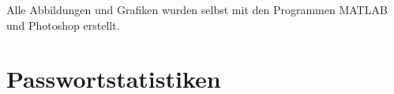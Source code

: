 \documentclass[12pt,a4paper]{scrartcl}
\newcommand{\spar}{\par\vspace{10pt}\noindent}
\numberwithin{equation}{section}
\numberwithin{myalgctr}{section}
\numberwithin{mytheoremctr}{section}
\begin{document}
%	
%	
%	
	
	
	
%
%
%	
%	
%	
	
	\newpage
	\printbibliography
	\listoffigures
	\vspace*{.5cm}\noindent
	Alle Abbildungen und Grafiken wurden selbst mit den Programmen MATLAB und Photoshop erstellt.
	\thispagestyle{firststyle}
	\listoftables
	\thispagestyle{firststyle}
	
	\newpage
	\appendix
	\section{Passwortstatistiken}\vspace*{.5cm}
	\newpage
\end{document}

